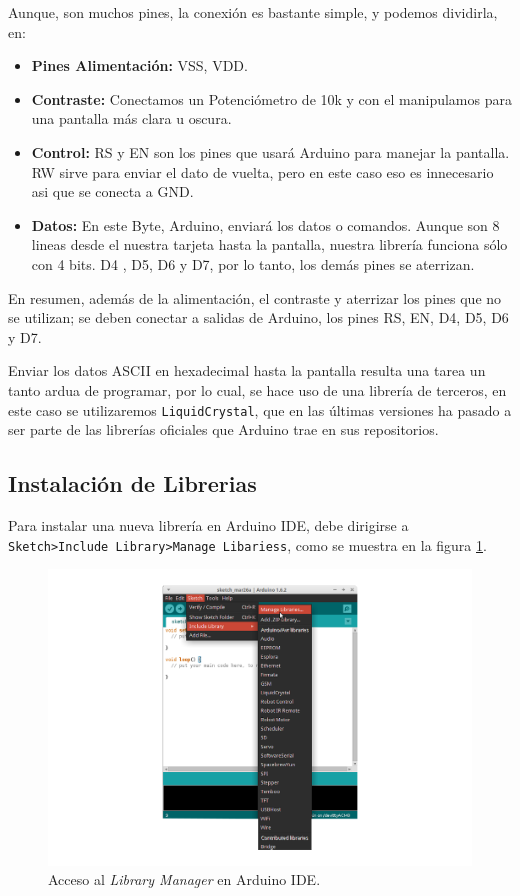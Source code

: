 \documentclass[letterpaper, 10pt]{report}
\begin{document}
Aunque, son muchos pines, la conexión es bastante simple, y podemos dividirla, en:
\begin{itemize}
	\item {\bf Pines Alimentación:} VSS, VDD.
	\item {\bf Contraste:} Conectamos un Potenciómetro de 10k y con el manipulamos para una pantalla más clara u oscura.
	\item {\bf Control:} RS y EN son los pines que usará Arduino para manejar la pantalla. RW sirve para enviar el dato de vuelta, pero en este caso eso es innecesario asi que se conecta a GND.
	
	\item {\bf Datos:} En este Byte, Arduino, enviará los datos o comandos. Aunque son 8 lineas desde el nuestra tarjeta hasta la pantalla, nuestra librería funciona sólo con 4 bits. D4 , D5, D6 y D7, por lo tanto, los demás pines se aterrizan.
\end{itemize}

En resumen, además de la alimentación, el contraste y aterrizar los pines que no se utilizan; se deben conectar a salidas de Arduino, los pines RS, EN, D4, D5, D6 y D7. 

Enviar los datos ASCII en hexadecimal hasta la pantalla resulta una tarea un tanto ardua de programar, por lo cual, se hace uso de una librería de terceros, en este caso se utilizaremos \texttt{LiquidCrystal}, que en las últimas versiones ha pasado a ser parte de las librerías oficiales que Arduino trae en sus repositorios.

\subsection{Instalación de Librerias}\label{library}

Para instalar una nueva librería en Arduino IDE, debe dirigirse a \texttt{Sketch>Include Library>Manage Libariess}, como se muestra en la figura \ref{linInstall}.

\begin{figure}[h]
\centering
\includegraphics[scale=0.5]{LibraryManager_1.png}
\caption{Acceso al \emph{Library Manager} en Arduino IDE. \label{linInstall}}
\end{figure}
\end{document}
